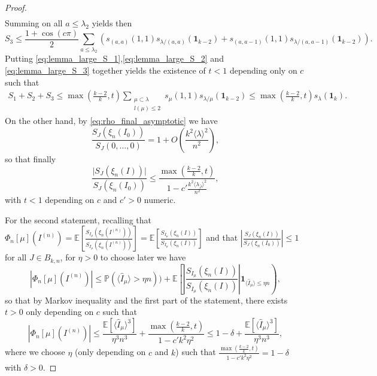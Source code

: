 \documentclass[10pt,11pt]{amsart}%
\def \l{\lambda}
\begin{document}
\begin{proof}
\begin{align*}
\end{align*}
Summing on all $a\leq \lambda_2$ yields then
\begin{equation}\label{eq:lemma_large_S_3}
S_3\leq \frac{1+\cos(c\pi)}{2}\sum_{a\leq \lambda_2}\left(s_{(a,a)}(1,1)s_{\lambda/(a,a)}(\mathbf{1}_{k-2})+s_{(a,a-1)}(1,1)s_{\lambda/(a,a-1)}(\mathbf{1}_{k-2})\right).
\end{equation}
Putting \eqref{eq:lemma_large_S_1},\eqref{eq:lemma_large_S_2} and \eqref{eq:lemma_large_S_3} together yields the existence of $t<1$ depending only on $c$ such that 
\begin{align*}
S_1+S_2+S_3\leq \max\left(\frac{k-2}{k},t\right) \sum_{\substack{\mu\subset \lambda\\l(\mu)\leq 2}}s_{\mu}(1,1)s_{\lambda/\mu}(\mathbf{1}_{k-2})\leq \max\left(\frac{k-2}{k},t\right) s_{\lambda}(\mathbf{1}_{k}).
\end{align*}
On the other hand, by \eqref{eq:rho_final_asymptotic} we have 
$$\frac{S_{J}(\xi_{n}(I_0))}{S_{J}(0,\ldots,0)}=1+O\left(\frac{k^2\langle \lambda\rangle^2}{n^2}\right),$$
so that finally
$$\frac{\vert S_{J}(\xi_{n}(I))\vert}{S_{J}(\xi_{n}(I_0))}\leq \frac{\max\left(\frac{k-2}{k},t\right)}{1-c'\frac{k^2\langle \lambda_{\hat{J}}\rangle^2}{n^2}},$$
with $t<1$ depending on $c$ and $c'>0$ numeric.

For the second statement, recalling that $\Phi_n[\mu](I^{(n)})=\mathbb{E}\left[\frac{S_{I_{\mu}}(\xi_{n}(I^{(n)}))}{S_{I_{\mu}}(\xi_{n}(I^{(n)}))}\right]=\mathbb{E}\left[\frac{S_{I_{\mu}}(\xi_{n}(I))}{S_{I_{\mu}}(\xi_{n}(I))}\right]$ and that $\left\vert \frac{S_{J}(\xi_{n}(I))}{S_{J}(\xi_{n}(I_0))}\right\vert\leq 1$ for all $J\in B_{k,n}$, for $\eta>0$ to choose later we have 
$$\left\vert\Phi_n[\mu](I^{(n)})\right\vert\leq \mathbb{P}(\langle  \hat{I}_{\mu}\rangle >\eta n))+\mathbb{E}\left[\left\vert\frac{S_{I_{\mu}}(\xi_{n}(I))}{S_{I_{\mu}}(\xi_{n}(I))}\right\vert\mathbf{1}_{\langle  \hat{I}_{\mu}\rangle \leq \eta n}\right),$$
so that by Markov inequality and the first part of the statement, there exists $t>0$ only depending on $c$ such that
$$\left\vert\Phi_n[\mu](I^{(n)})\right\vert\leq \frac{\mathbb{E}\left[\langle  \hat{I}_{\mu}\rangle^3\right]}{\eta^3n^3}+\frac{\max(\frac{k-2}{k},t)}{1-c' k^2\eta^2}\leq 1-\delta+\frac{\mathbb{E}\left[\langle  \hat{I}_{\mu}\rangle^3\right]}{\eta^3n^3},$$
where we choose $\eta$ (only depending on $c$ and $k$) such that $\frac{\max(\frac{k-2}{k},t)}{1-c' k^2\eta^2}=1-\delta$ with $\delta>0$. 


\end{proof}
\end{document}
